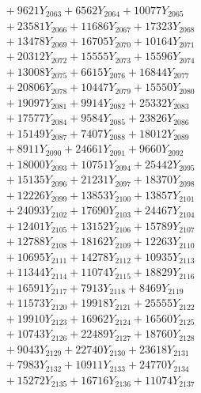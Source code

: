 \documentclass[a4paper,10pt]{article}
\begin{document}
{\begin{align}
&\;  + 9621 Y_{2063} + 6562 Y_{2064} + 10077 Y_{2065} \\[0.3ex]
&\;  + 23581 Y_{2066} + 11686 Y_{2067} + 17323 Y_{2068} \\[0.5ex]\allowbreak
&\;  + 13478 Y_{2069} + 16705 Y_{2070} + 10164 Y_{2071} \\[0.3ex]
&\;  + 20312 Y_{2072} + 15555 Y_{2073} + 15596 Y_{2074} \\[0.3ex]
&\;  + 13008 Y_{2075} + 6615 Y_{2076} + 16844 Y_{2077} \\[0.3ex]
&\;  + 20806 Y_{2078} + 10447 Y_{2079} + 15550 Y_{2080} \\[0.3ex]
&\;  + 19097 Y_{2081} + 9914 Y_{2082} + 25332 Y_{2083} \\[0.3ex]
&\;  + 17577 Y_{2084} + 9584 Y_{2085} + 23826 Y_{2086} \\[0.3ex]
&\;  + 15149 Y_{2087} + 7407 Y_{2088} + 18012 Y_{2089} \\[0.3ex]
&\;  + 8911 Y_{2090} + 24661 Y_{2091} + 9660 Y_{2092} \\[0.3ex]
&\;  + 18000 Y_{2093} + 10751 Y_{2094} + 25442 Y_{2095} \\[0.3ex]
&\;  + 15135 Y_{2096} + 21231 Y_{2097} + 18370 Y_{2098} \\[0.5ex]\allowbreak
&\;  + 12226 Y_{2099} + 13853 Y_{2100} + 13857 Y_{2101} \\[0.3ex]
&\;  + 24093 Y_{2102} + 17690 Y_{2103} + 24467 Y_{2104} \\[0.3ex]
&\;  + 12401 Y_{2105} + 13152 Y_{2106} + 15789 Y_{2107} \\[0.3ex]
&\;  + 12788 Y_{2108} + 18162 Y_{2109} + 12263 Y_{2110} \\[0.3ex]
&\;  + 10695 Y_{2111} + 14278 Y_{2112} + 10935 Y_{2113} \\[0.3ex]
&\;  + 11344 Y_{2114} + 11074 Y_{2115} + 18829 Y_{2116} \\[0.3ex]
&\;  + 16591 Y_{2117} + 7913 Y_{2118} + 8469 Y_{2119} \\[0.3ex]
&\;  + 11573 Y_{2120} + 19918 Y_{2121} + 25555 Y_{2122} \\[0.3ex]
&\;  + 19910 Y_{2123} + 16962 Y_{2124} + 16560 Y_{2125} \\[0.3ex]
&\;  + 10743 Y_{2126} + 22489 Y_{2127} + 18760 Y_{2128} \\[0.5ex]\allowbreak
&\;  + 9043 Y_{2129} + 22740 Y_{2130} + 23618 Y_{2131} \\[0.3ex]
&\;  + 7983 Y_{2132} + 10911 Y_{2133} + 24770 Y_{2134} \\[0.3ex]
&\;  + 15272 Y_{2135} + 16716 Y_{2136} + 11074 Y_{2137} \\[0.3ex]

\end{align}}
\end{document}
